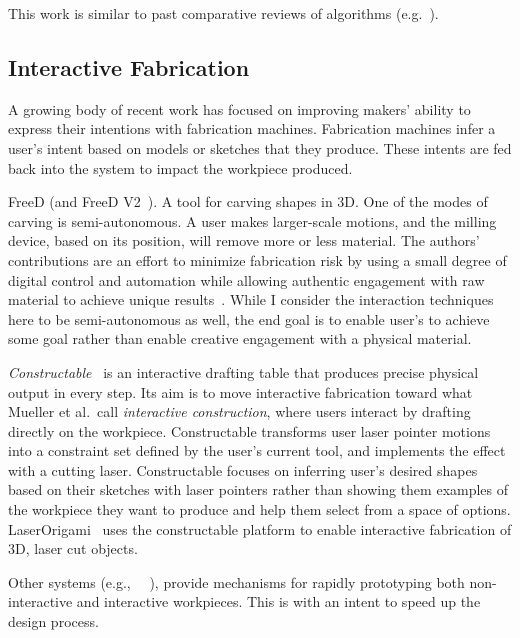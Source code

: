 This work is similar to past comparative reviews of algorithms (e.g.~\cite{hansen_comparing_2010,mersmann_benchmarking_2010}).

\subsection{Interactive Fabrication}

A growing body of recent work has focused on improving makers' ability to express their intentions with fabrication machines.
Fabrication machines infer a user's intent based on models or sketches that they produce.
These intents are fed back into the system to impact the workpiece produced.

FreeD (and FreeD V2~\cite{zoran_human-computer_2013}).
A tool for carving shapes in 3D.
One of the modes of carving is semi-autonomous.
A user makes larger-scale motions, and the milling device, based on its position, will remove more or less material.
The authors' contributions are an effort to minimize fabrication risk by using a small degree of digital control and automation while allowing authentic engagement with raw material to achieve unique results~\cite{zoran_hybrid_2014}.
While I consider the interaction techniques here to be semi-autonomous as well, the end goal is to enable user's to achieve some goal rather than enable creative engagement with a physical material.

\emph{Constructable}~\cite{mueller_interactive_2012} is an interactive drafting table that produces precise physical output in every step.
Its aim is to move interactive fabrication toward what Mueller et al.\ call \emph{interactive construction}, where users interact by drafting directly on the workpiece.
Constructable transforms user laser pointer motions into a constraint set defined by the user's current tool, and implements the effect with a cutting laser.
Constructable focuses on inferring user's desired shapes based on their sketches with laser pointers rather than showing them examples of the workpiece they want to produce and help them select from a space of options.
LaserOrigami~\cite{mueller_laserorigami_2013} uses the constructable platform to enable interactive fabrication of 3D, laser cut objects.

Other systems (e.g., ~\cite{mueller_wireprint_2014}~\cite{savage_sauron_2013}), provide mechanisms for rapidly prototyping both non-interactive and interactive workpieces.
This is with an intent to speed up the design process.
